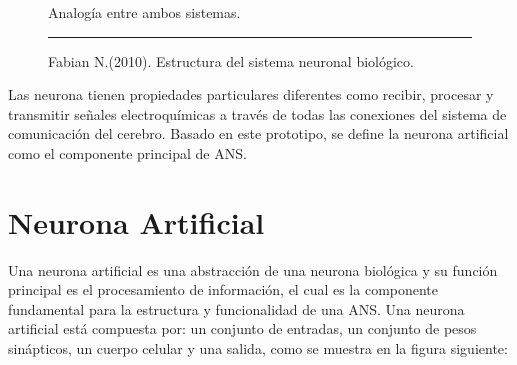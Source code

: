 \documentclass[11pt,titlepage]{report}
\begin{document}
\begin{figure}[h]
	\centering
	 \caption{Analogía entre ambos sistemas.\cite{Art14}}
	\caption{Fabian N.(2010). Estructura del sistema neuronal biológico. \cite{Int09}}
	\hrule
\end{figure}

Las neurona tienen propiedades particulares diferentes como recibir, procesar y transmitir señales electroquímicas a través de todas las conexiones del sistema de comunicación del cerebro. Basado en este prototipo, se define la neurona artificial como el componente principal de ANS.

\section{Neurona Artificial}
Una neurona artificial es una abstracción de una neurona biológica y su función principal es el procesamiento de información, el cual es la componente fundamental para la estructura y funcionalidad de una ANS. Una neurona artificial está compuesta por: un conjunto de entradas, un conjunto de pesos sinápticos, un cuerpo celular y una salida, como se muestra en la figura siguiente: 
\end{document}
